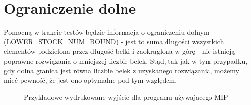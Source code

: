 \section{Ograniczenie dolne}
Pomocną w trakcie testów będzie informacja o ograniczeniu dolnym \\ (LOWER\_STOCK\_NUM\_BOUND) - jest to suma długości wszystkich elementów podzielona przez długość belki i zaokrąglona w górę - nie istnieją poprawne rozwiązania o mniejszej liczbie belek. Stąd, tak jak w tym przypadku, gdy dolna granica jest równa liczbie belek z uzyskanego rozwiązania, możemy mieć pewność, że jest ono optymalne pod tym względem.

\begin{figure}[h!]
	
	\caption{Przykładowe wydrukowane wyjście dla programu używajacego MIP}
	\label{output_example}
\end{figure}







